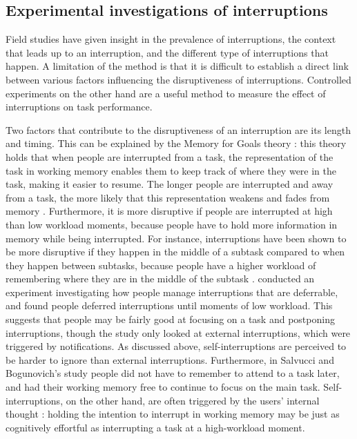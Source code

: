 \subsection{Experimental investigations of interruptions}
Field studies have given insight in the prevalence of interruptions, the context that leads up to an interruption, and the different type of interruptions that happen. A limitation of the method is that it is difficult to establish a direct link between various factors influencing the disruptiveness of interruptions. Controlled experiments on the other hand are a useful method to measure the effect of interruptions on task performance.

Two factors that contribute to the disruptiveness of an interruption are its length and timing. This can be explained by the Memory for Goals theory \citep{Altmann2002}: this theory holds that when people are interrupted from a task, the representation of the task in working memory enables them to keep track of where they were in the task, making it easier to resume. The longer people are interrupted and away from a task, the more likely that this representation weakens and fades from memory \citep{Altmann2017, Monk2008}. Furthermore, it is more disruptive if people are interrupted at high than low workload moments, because people have to hold more information in memory while being interrupted. For instance, interruptions have been shown to be more disruptive if they happen in the middle of a subtask compared to when they happen between subtasks, because people have a higher workload of remembering where they are in the middle of the subtask \citep{Gould2013a, Iqbal2005}. \citet{Salvucci2010} conducted an experiment investigating how people manage interruptions that are deferrable, and found people deferred interruptions until moments of low workload. This suggests that people may be fairly good at focusing on a task and postponing interruptions, though the study only looked at external interruptions, which were triggered by notifications. As discussed above, self-interruptions are perceived to be harder to ignore than external interruptions. Furthermore, in Salvucci and Bogunovich's study people did not have to remember to attend to a task later, and had their working memory free to continue to focus on the main task. Self-interruptions, on the other hand, are often triggered by the users' internal thought \citep{Jin2009}: holding the intention to interrupt in working memory may be just as cognitively effortful as interrupting a task at a high-workload moment.

